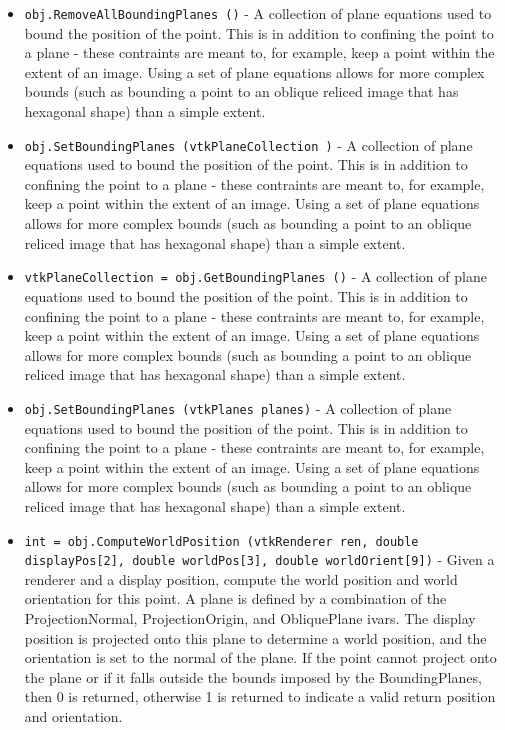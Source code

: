 \begin{itemize}
\item  \verb|obj.RemoveAllBoundingPlanes ()| -  A collection of plane equations used to bound the position of the point.
 This is in addition to confining the point to a plane - these contraints
 are meant to, for example, keep a point within the extent of an image.
 Using a set of plane equations allows for more complex bounds (such as
 bounding a point to an oblique reliced image that has hexagonal shape)
 than a simple extent.

\item  \verb|obj.SetBoundingPlanes (vtkPlaneCollection )| -  A collection of plane equations used to bound the position of the point.
 This is in addition to confining the point to a plane - these contraints
 are meant to, for example, keep a point within the extent of an image.
 Using a set of plane equations allows for more complex bounds (such as
 bounding a point to an oblique reliced image that has hexagonal shape)
 than a simple extent.

\item  \verb|vtkPlaneCollection = obj.GetBoundingPlanes ()| -  A collection of plane equations used to bound the position of the point.
 This is in addition to confining the point to a plane - these contraints
 are meant to, for example, keep a point within the extent of an image.
 Using a set of plane equations allows for more complex bounds (such as
 bounding a point to an oblique reliced image that has hexagonal shape)
 than a simple extent.

\item  \verb|obj.SetBoundingPlanes (vtkPlanes planes)| -  A collection of plane equations used to bound the position of the point.
 This is in addition to confining the point to a plane - these contraints
 are meant to, for example, keep a point within the extent of an image.
 Using a set of plane equations allows for more complex bounds (such as
 bounding a point to an oblique reliced image that has hexagonal shape)
 than a simple extent.

\item  \verb|int = obj.ComputeWorldPosition (vtkRenderer ren, double displayPos[2], double worldPos[3], double worldOrient[9])| -  Given a renderer and a display position, compute the 
 world position and world orientation for this point. 
 A plane is defined by a combination of the
 ProjectionNormal, ProjectionOrigin, and ObliquePlane
 ivars. The display position is projected onto this
 plane to determine a world position, and the 
 orientation is set to the normal of the plane. If
 the point cannot project onto the plane or if it
 falls outside the bounds imposed by the
 BoundingPlanes, then 0 is returned, otherwise 1 is
 returned to indicate a valid return position and
 orientation.


\end{itemize}
